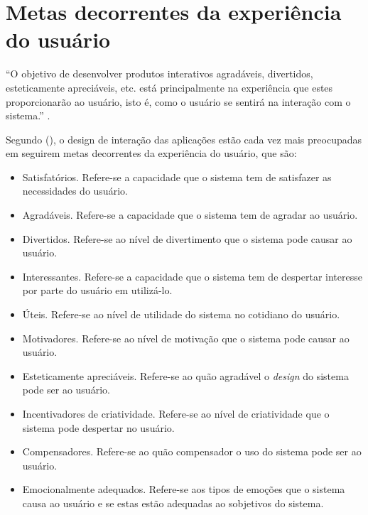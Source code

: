   \section{Metas decorrentes da experiência do usuário}
    
    “O objetivo de desenvolver produtos interativos agradáveis, divertidos, esteticamente apreciáveis, etc. 
    está principalmente na experiência que estes proporcionarão ao usuário, isto é, como o usuário se 
    sentirá na interação com o sistema.” \cite{preece}.
    
    Segundo \citeauthor{preece} (\citeyear{preece}), o design de interação das aplicações estão cada vez mais preocupadas em seguirem 
    metas decorrentes da experiência do usuário, que são:
    
    \begin{itemize}
       \item Satisfatórios.
       \subitem Refere-se a capacidade que o sistema tem de satisfazer as necessidades do usuário.

       \item Agradáveis.
       \subitem Refere-se a capacidade que o sistema tem de agradar ao usuário.

       \item Divertidos.
       \subitem Refere-se ao nível de divertimento que o sistema pode causar ao usuário.

       \item Interessantes.
       \subitem Refere-se a capacidade que o sistema tem de despertar interesse por parte do usuário em utilizá-lo.

       \item Úteis.
       \subitem Refere-se ao nível de utilidade do sistema no cotidiano do usuário.

       \item Motivadores.
       \subitem Refere-se ao nível de motivação que o sistema pode causar ao usuário.

       \item Esteticamente apreciáveis.
       \subitem Refere-se ao quão agradável o \textit{design} do sistema pode ser ao usuário.

       \item Incentivadores de criatividade.
       \subitem Refere-se ao nível de criatividade que o sistema pode despertar no usuário.

       \item Compensadores.
       \subitem Refere-se ao quão compensador o uso do sistema pode ser ao usuário.

       \item Emocionalmente adequados.
       \subitem Refere-se aos tipos de emoções que o sistema causa ao usuário e se estas estão adequadas ao sobjetivos do sistema.
    \end{itemize}    
    
